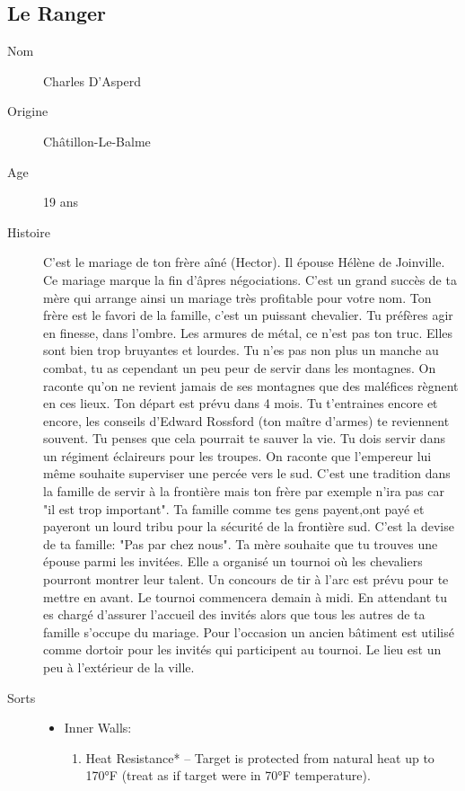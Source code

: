 \documentclass[oneside,12pt]{book}
\begin{document}
\begin{flushleft}
\subsection{Le Ranger}
\begin{description}
\item[Nom]{Charles D'Asperd }
\item[Origine]{Châtillon-Le-Balme}
\item[Age]{19 ans}
\item[Histoire]{
\small C'est le mariage de ton frère aîné (Hector). Il épouse Hélène de Joinville. Ce mariage marque la fin d'âpres négociations. C'est un grand succès de ta mère qui arrange ainsi un mariage très profitable pour votre nom. Ton frère est le favori de la famille, c'est un puissant chevalier. Tu préfères agir en finesse, dans l'ombre. Les armures de métal, ce n'est pas ton truc. Elles sont bien trop bruyantes et lourdes. Tu n'es pas non plus un manche au combat, tu as cependant un peu peur de servir dans les montagnes. On raconte qu'on ne revient jamais de ses montagnes que des maléfices règnent en ces lieux. Ton départ est prévu dans 4 mois. Tu t'entraines encore et encore, les conseils d'Edward Rossford (ton maître d'armes) te reviennent souvent. Tu penses que cela pourrait te sauver la vie. Tu dois servir dans un régiment éclaireurs pour les troupes. On raconte que l'empereur lui même souhaite superviser une percée vers le sud. 
C'est une tradition dans la famille de servir à la frontière mais ton frère par exemple n'ira pas car "il est trop important". Ta famille comme tes gens payent,ont payé et payeront un lourd tribu pour la sécurité de la frontière sud. C'est la devise de ta famille: "Pas par chez nous". 
Ta mère souhaite que tu trouves une épouse parmi les invitées. Elle a organisé un tournoi où les chevaliers pourront montrer leur talent. Un concours de tir à l'arc est prévu pour te mettre en avant. Le tournoi commencera demain à midi. En attendant tu es chargé d'assurer l'accueil des invités alors que tous les autres de ta famille s'occupe du mariage. Pour l'occasion un ancien bâtiment est utilisé comme dortoir pour les invités qui participent au tournoi. Le lieu est un peu à l'extérieur de la ville. 
}
\item[Sorts]{
\begin{itemize}
\item Inner Walls:
\begin{enumerate}
\scriptsize
\item Heat Resistance* –  Target is protected from natural heat
up to 170°F (treat as if target were in 70°F temperature).

\end{enumerate}
\end{itemize}}
\end{description}
\end{flushleft}
\end{document}
